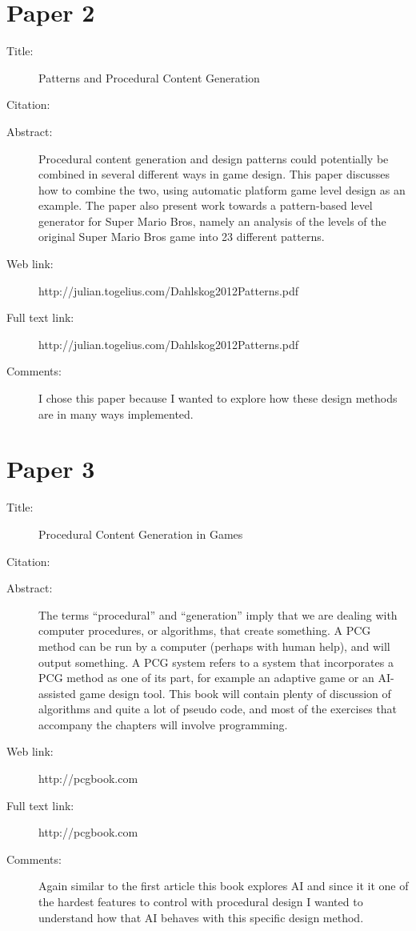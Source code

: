 \documentclass{scrartcl}
\begin{document}
\section*{Paper 2}
\begin{description}
\item[Title:] Patterns and Procedural Content Generation
\item[Citation:] \cite{bibtex_key}
\item[Abstract:] Procedural content generation and design patterns could potentially
be combined in several different ways in game design.
This paper discusses how to combine the two, using
automatic platform game level design as an example. The
paper also present work towards a pattern-based level generator
for Super Mario Bros, namely an analysis of the levels
of the original Super Mario Bros game into 23 different patterns.
\item[Web link:] http://julian.togelius.com/Dahlskog2012Patterns.pdf
\item[Full text link:] http://julian.togelius.com/Dahlskog2012Patterns.pdf
\item[Comments:] I chose this paper because I wanted to explore how these design methods are in many ways implemented.
\end{description}

\section*{Paper 3}
\begin{description}
\item[Title:] Procedural Content Generation in Games
\item[Citation:] \cite{bibtex_key}
\item[Abstract:] The terms “procedural” and “generation” imply that we are dealing with computer procedures, or algorithms, that create something. A PCG method can be run by a computer (perhaps with human help), and will output something. A PCG system refers to a system that incorporates a PCG method as one of its part, for example an adaptive game or an AI-assisted game design tool. This book will contain plenty of discussion of algorithms and quite a lot of pseudo code, and most of the exercises that accompany the chapters will involve programming.
\item[Web link:] http://pcgbook.com
\item[Full text link:] http://pcgbook.com
\item[Comments:] Again similar to the first article this book explores AI and since it it one of the hardest features to control with procedural design I wanted to understand how that AI behaves with this specific design method.
\end{description}
\end{document}
